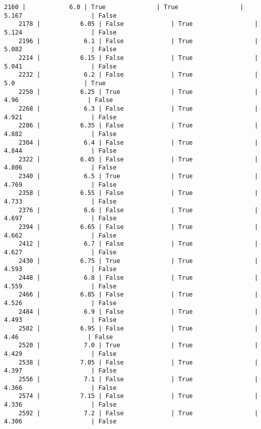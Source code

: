 \documentclass{article}
\begin{document}
\begin{Verbatim}[commandchars=\\\{\}]
    2160 |            6.0 | True              | True                 |   5.167                   | False
    2178 |           6.05 | False             | True                 |   5.124                   | False
    2196 |            6.1 | False             | True                 |   5.082                   | False
    2214 |           6.15 | False             | True                 |   5.041                   | False
    2232 |            6.2 | False             | True                 |     5.0                   | True
    2250 |           6.25 | True              | True                 |    4.96                   | False
    2268 |            6.3 | False             | True                 |   4.921                   | False
    2286 |           6.35 | False             | True                 |   4.882                   | False
    2304 |            6.4 | False             | True                 |   4.844                   | False
    2322 |           6.45 | False             | True                 |   4.806                   | False
    2340 |            6.5 | True              | True                 |   4.769                   | False
    2358 |           6.55 | False             | True                 |   4.733                   | False
    2376 |            6.6 | False             | True                 |   4.697                   | False
    2394 |           6.65 | False             | True                 |   4.662                   | False
    2412 |            6.7 | False             | True                 |   4.627                   | False
    2430 |           6.75 | True              | True                 |   4.593                   | False
    2448 |            6.8 | False             | True                 |   4.559                   | False
    2466 |           6.85 | False             | True                 |   4.526                   | False
    2484 |            6.9 | False             | True                 |   4.493                   | False
    2502 |           6.95 | False             | True                 |    4.46                   | False
    2520 |            7.0 | True              | True                 |   4.429                   | False
    2538 |           7.05 | False             | True                 |   4.397                   | False
    2556 |            7.1 | False             | True                 |   4.366                   | False
    2574 |           7.15 | False             | True                 |   4.336                   | False
    2592 |            7.2 | False             | True                 |   4.306                   | False

\end{Verbatim}
\end{document}
